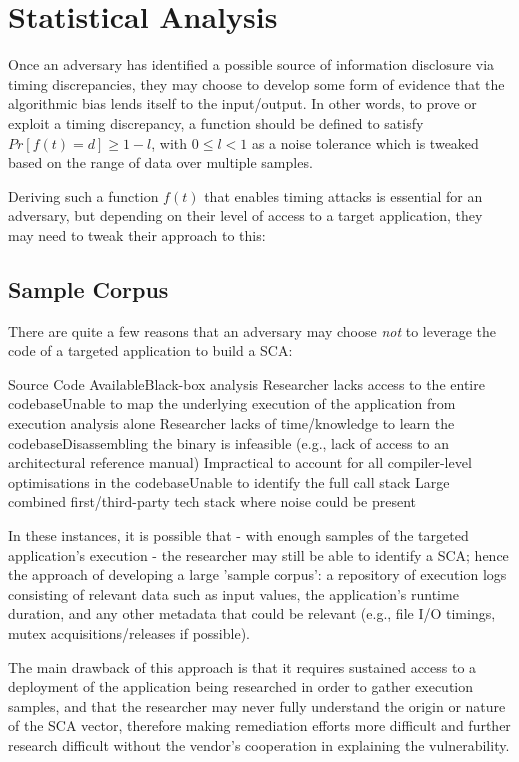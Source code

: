\section{Statistical Analysis}
		
			Once an adversary has identified a possible source of information disclosure via timing discrepancies, they may choose to
			develop some form of evidence that the algorithmic bias lends itself to the input/output. In other words, to prove or exploit
			a timing discrepancy, a function should be defined to satisfy
			\emph{$Pr[f(t)=d]\geq1-l$}, with \emph{$0 \leq l \lt 1$} as a noise tolerance which is tweaked based on the range of data over multiple samples.
		
		
			Deriving such a function \emph{$f(t)$} that enables timing attacks is essential for an adversary, but depending on their level of access
			to a target application, they may need to tweak their approach to this:
		
\subsection{Sample Corpus}
		
			There are quite a few reasons that an adversary may choose \textit{not} to leverage the code of a targeted application
			to build a SCA:
		
		
			Source Code AvailableBlack-box analysis
			Researcher lacks access to the entire  codebaseUnable to map the underlying execution of the application from execution analysis alone
			Researcher lacks of time/knowledge to learn the codebaseDisassembling the binary is infeasible (e.g., lack of access to an architectural reference manual)
			Impractical to account for all compiler-level optimisations in the codebaseUnable to identify the full call stack
			Large combined first/third-party tech stack where noise could be present
		
		
			In these instances, it is possible that - with enough samples of the targeted application's execution - the researcher may still be
			able to identify a SCA; hence the approach of developing a large 'sample corpus': a repository of execution logs consisting of relevant data
			such as input values, the application's runtime duration, and any other metadata that could be relevant (e.g., file I/O timings, mutex acquisitions/releases if possible).
		
		
			The main drawback of this approach is that it requires sustained access to a deployment of the application being researched in order
			to gather execution samples, and that the researcher may never fully understand the origin or nature of the SCA vector, therefore making remediation
			efforts more difficult and further research difficult without the vendor's cooperation in explaining the vulnerability.
		
